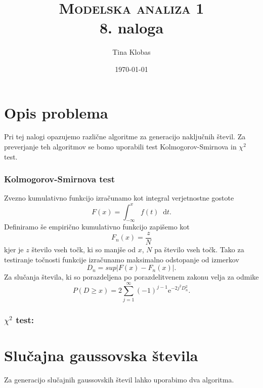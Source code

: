 \documentclass[a4paper,pdftex,12pt]{article}
\title{	
\normalfont \normalsize 
\textsc{Modelska analiza 1} \\ [25pt] %
\huge 8. naloga\\ %
}
\author{Tina Klobas} %
\date{\normalsize\today} %
\newcommand*\diff{\mathop{}\!\mathrm{d}}	%
\numberwithin{figure}{section} %
\begin{document}
\maketitle %

\section{Opis problema}
Pri tej nalogi opazujemo različne algoritme za generacijo naključnih števil. Za preverjanje
teh algoritmov se bomo uporabili test Kolmogorov-Smirnova in $\chi^2$ test.

\subsubsection*{Kolmogorov-Smirnova test}
Zvezno kumulativno funkcijo izračunamo kot integral verjetnostne gostote
\begin{equation} \label{kumul}
    F(x) = \int_{-\infty}^{x} f(t) \diff t.
\end{equation}
Definiramo še empirično kumulativno funkcijo zapišemo kot
\begin{equation} \label{empiric}
    F_n(x) = \frac{z}{N}
\end{equation}
kjer je $z$ število vseh točk, ki so manjše od $x$, $N$ pa število vseh točk. Tako za 
testiranje točnosti funkcije izračunamo maksimalno odstopanje od izmerkov 
\begin{equation}\label{supremum}
    D_n = sup \left| F(x) - F_n(x) \right|.
\end{equation}
Za slučanja števila, ki so porazdeljena po porazdelitvenem zakonu velja za odmike
\begin{equation}\label{KS}
    P(D \geq x) = 2 \sum_{j=1}^{\infty} (-1)^{j-1} \mathrm{e}^{-2j^2 D_n^2}.
\end{equation}

\subsubsection*{$\chi^2$ test:}


\section{Slučajna gaussovska števila}
Za generacijo slučajnih gaussovskih števil lahko uporabimo dva algoritma. 
\end{document}
